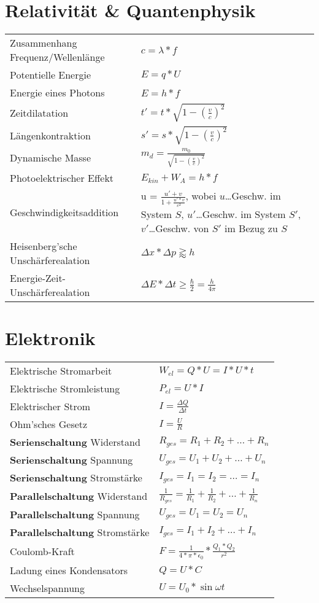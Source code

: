 \documentclass[12pt,a4paper]{paper}
\begin{document}
\section{Relativität \& Quantenphysik}
\begin{tabularx}{\textwidth}{X|X}
Zusammenhang Frequenz/Wellenlänge & $c = \lambda * f$\\
Potentielle Energie & $E=q*U$\\
Energie eines Photons &  $E = h *f$\\
Zeitdilatation & $t' = t * \sqrt{1- (\frac{v}{c})^2}$\\
Längenkontraktion & $s' = s * \sqrt{1- (\frac{v}{c})^2}$\\
Dynamische Masse & $m_{d} = \frac{m_0}{\sqrt{1- (\frac{v}{c})^2}}$\\
Photoelektrischer Effekt & $E_{kin} + W_A=h*f$\\
Geschwindigkeitsaddition & u = $\frac{{u' + v}}{{1 + \frac{{u'  * v}}{{{c^2}}}}} $, wobei $u$\dots Geschw. im System $S$, $u'$\dots Geschw. im System $S'$, $v'$\dots Geschw. von $S'$ im Bezug zu $S$\\
Heisenberg'sche Unschärferealation & $\Delta x * \Delta p \gtrapprox h $\\
Energie-Zeit-Unschärferealation & $\Delta E * \Delta t \ge \frac{\hbar}{2} = \frac{h}{4\pi}$
\end{tabularx}
\section{Elektronik}
\begin{tabularx}{\textwidth}{X|X}
	Elektrische Stromarbeit & $ W_{el} = Q * U = I * U * t$\\
	Elektrische Stromleistung & $P_{el} = U * I$\\
	Elektrischer Strom & $I = \frac{\Delta Q}{\Delta t}$\\
	Ohm'sches Gesetz & $I=\frac{U}{R}$\\
	\textbf{Serienschaltung} Widerstand & $R_{ges} = R_1 + R_2 + \dots + R_n$\\
	\textbf{Serienschaltung} Spannung & $U_{ges} = U_1 + U_2 + \dots + U_n$\\
	\textbf{Serienschaltung} Stromstärke & $ I_{ges} = I_1 = I_2 = \dots  = I_n$\\

	\textbf{Parallelschaltung} Widerstand & $\frac{1}{R_{ges}} = \frac{1}{R_{1}} + \frac{1}{R_{2}} + \dots + \frac{1}{R_{n}}$\\
	\textbf{Parallelschaltung} Spannung & $U_{ges} = U_{1} = U_{2} = U_{n}$\\
	\textbf{Parallelschaltung} Stromstärke  & $I_{ges}=I_{1}+I_{2}+\dots+I_{n}$\\
	Coulomb-Kraft & $F = \frac{1}{4*\pi * \epsilon_{0}} * \frac{Q_1 * Q_2}{r^2}$\\
	Ladung eines Kondensators & $Q = U * C$\\
	Wechselspannung & $U = U_0 * \sin{\omega t}$\\
\end{tabularx}
\end{document}
